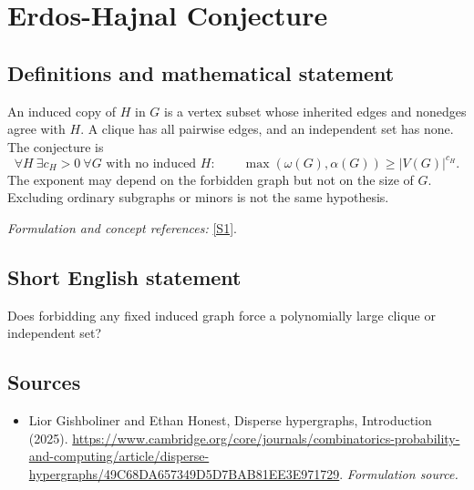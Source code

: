 \documentclass[11pt]{article}
\begin{document}
\section*{\texorpdfstring{Erdos-Hajnal Conjecture}{Erdos-Hajnal Conjecture}}\label{126}
\subsection{Definitions and mathematical statement}
An induced copy of $H$ in $G$ is a vertex subset whose inherited edges and nonedges agree with $H$. A clique has all pairwise edges, and an independent set has none. The conjecture is
\[
 \forall H\ \exists c_H>0\ \forall G\text{ with no induced }H:\qquad
 \max(\omega(G),\alpha(G))\ge |V(G)|^{c_H}.
\]
The exponent may depend on the forbidden graph but not on the size of $G$. Excluding ordinary subgraphs or minors is not the same hypothesis.
\par\smallskip\textit{Formulation and concept references:} \href{https://www.cambridge.org/core/journals/combinatorics-probability-and-computing/article/disperse-hypergraphs/49C68DA657349D5D7BAB81EE3E971729}{[S1]}.

\subsection{Short English statement}
Does forbidding any fixed induced graph force a polynomially large clique or independent set?
\subsection{Sources}
\begin{itemize}
\item[S1]Lior Gishboliner and Ethan Honest, Disperse hypergraphs, Introduction (2025).
\url{https://www.cambridge.org/core/journals/combinatorics-probability-and-computing/article/disperse-hypergraphs/49C68DA657349D5D7BAB81EE3E971729}.
\textit{Formulation source.}
\end{itemize}
\end{document}
